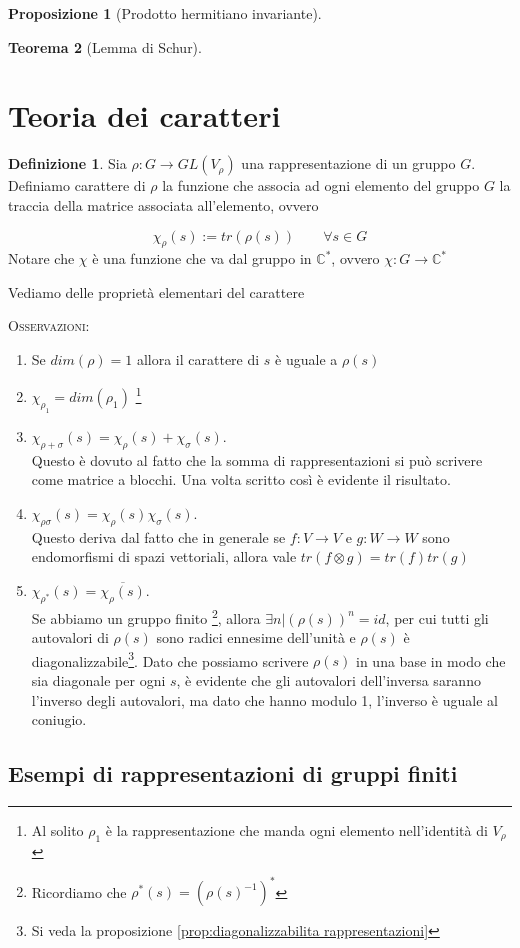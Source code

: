 \documentclass[11pt]{article}
\theoremstyle{plain}
\newtheorem{thm}{Teorema}[section]
\newtheorem{prop}[thm]{Proposizione}
\theoremstyle{definition}
\newtheorem{defn}{Definizione}[section]
\theoremstyle{remark}
\newcommand{\C}{\mathbb{C}}
\begin{document}
\begin{prop}[Prodotto hermitiano invariante]

\end{prop}



\begin{thm}[Lemma di Schur]


\end{thm}








\newpage
\section{Teoria dei caratteri}


\begin{defn}
Sia $\rho: G \to GL(V_\rho)$ una rappresentazione di un gruppo $G$. Definiamo carattere di $\rho$ la funzione che associa ad ogni elemento del gruppo $G$ la traccia della matrice associata all'elemento, ovvero

\[\chi_\rho(s) := tr (\rho(s)) \qquad \forall s \in G \]
Notare che $\chi$ è una funzione che va dal gruppo in $\C^*$, ovvero $\chi: G \to \C^*$

\end{defn}

Vediamo delle proprietà elementari del carattere

\textsc{Osservazioni:}
\begin{enumerate}
	\item Se $dim(\rho) = 1$ allora il carattere di $s$ è uguale a $\rho(s)$
	\item $\chi_{\rho_1} = dim(\rho_1)$ \footnote{Al solito $\rho_1$ è la rappresentazione che manda ogni elemento nell'identità di $V_\rho$}
	\item $\chi_{\rho + \sigma}(s) = \chi_\rho(s) + \chi_\sigma(s)$.\\ 
	Questo è dovuto al fatto che la somma di rappresentazioni si può scrivere come matrice a blocchi. Una volta scritto così è evidente il risultato.
	\item $\chi_{\rho\sigma}(s) = \chi_\rho(s)\chi_\sigma(s)$.\\ 
	Questo deriva dal fatto che in generale se $f: V \to V$ e $g: W \to W$ sono endomorfismi di spazi vettoriali, allora vale $tr(f \otimes g) = tr(f)tr(g)$
	
	\item $\chi_{\rho^*}(s) = \overline{\chi_\rho(s)}$.\\
			Se abbiamo un gruppo finito \footnote{Ricordiamo che $\rho^*(s) = (\rho(s)^{-1})^*$}, allora $\exists n | (\rho(s))^n = id$, per cui tutti gli autovalori di $\rho(s)$ sono radici ennesime dell'unità e $\rho(s)$ è diagonalizzabile\footnote{Si veda la proposizione \ref{prop:diagonalizzabilita rappresentazioni}}. Dato che possiamo scrivere $\rho(s)$ in una base in modo che sia diagonale per ogni $s$, è evidente che gli autovalori dell'inversa saranno l'inverso degli autovalori, ma dato che hanno modulo 1, l'inverso è uguale al coniugio. 
 \end{enumerate}





\subsection{Esempi di rappresentazioni di gruppi finiti}
\end{document}
